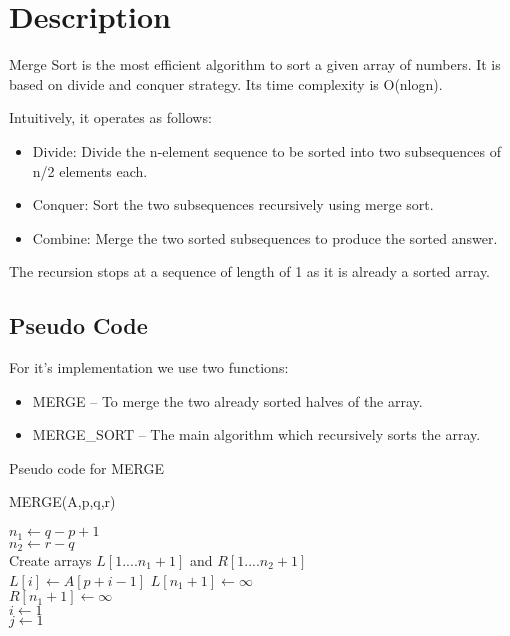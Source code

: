 \documentclass{article}
\author{Group}
\date{Feburary 2017 }
\begin{document}
\maketitle
\section{Description}
Merge Sort is the most efficient algorithm to sort a given array of numbers. It is based on divide and conquer strategy. Its time complexity is O(nlogn). 

Intuitively, it operates as follows:
\begin{itemize}

	\item Divide: Divide the n-element sequence to be sorted into two subsequences of n/2 elements each.
	\item Conquer: Sort the two subsequences recursively using merge sort.
	\item Combine: Merge the two sorted subsequences to produce the sorted answer.
\end{itemize}    

		The recursion stops at a sequence of length of 1 as it is already a sorted array.
\subsection{Pseudo Code}

		For it's implementation we use two functions:
		\begin{itemize}
			\item MERGE -- To merge the two already sorted halves of the array.
			\item MERGE\_SORT -- The main algorithm which recursively sorts the array. 
		\end{itemize}	

		Pseudo code for MERGE\\
		\begin{algorithm}[H]
			\caption{MERGE(A,p,q,r)}
			\SetAlgoLined 
			$n_1 \gets q-p+1$ \\ 
			$n_2 \gets r-q$ \\
			Create arrays $L[1 .... n_1 + 1] $ and $ R[1 .... n_2 + 1]$ \\
			 {
				$L[i] \gets A[p + i -1]$ 
			}
			$L[n_1 + 1] \gets \infty$ \\
			$R[n_1 + 1] \gets \infty$ \\
			$i \gets 1$ \\
			$j \gets 1$ \\
		\end{algorithm}
        \newpage
		
\end{document}
